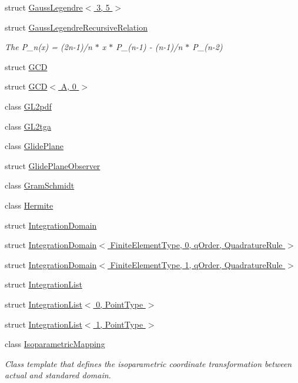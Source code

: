 \begin{DoxyCompactItemize}
struct \hyperlink{structmodel_1_1_gauss_legendre_3_013_00_015_01_4}{Gauss\+Legendre$<$ 3, 5 $>$}
\item 
struct \hyperlink{structmodel_1_1_gauss_legendre_recursive_relation}{Gauss\+Legendre\+Recursive\+Relation}
\begin{DoxyCompactList}\small\item\em The P\+\_\+n(x) = (2n-\/1)/n $\ast$ x $\ast$ P\+\_\+(n-\/1) -\/ (n-\/1)/n $\ast$ P\+\_\+(n-\/2) \end{DoxyCompactList}\item 
struct \hyperlink{structmodel_1_1_g_c_d}{G\+C\+D}
\item 
struct \hyperlink{structmodel_1_1_g_c_d_3_01_a_00_010_01_4}{G\+C\+D$<$ A, 0 $>$}
\item 
class \hyperlink{classmodel_1_1_g_l2pdf}{G\+L2pdf}
\item 
class \hyperlink{classmodel_1_1_g_l2tga}{G\+L2tga}
\item 
class \hyperlink{classmodel_1_1_glide_plane}{Glide\+Plane}
\item 
struct \hyperlink{structmodel_1_1_glide_plane_observer}{Glide\+Plane\+Observer}
\item 
class \hyperlink{classmodel_1_1_gram_schmidt}{Gram\+Schmidt}
\item 
class \hyperlink{classmodel_1_1_hermite}{Hermite}
\item 
struct \hyperlink{structmodel_1_1_integration_domain}{Integration\+Domain}
\item 
struct \hyperlink{structmodel_1_1_integration_domain_3_01_finite_element_type_00_010_00_01q_order_00_01_quadrature_rule_01_4}{Integration\+Domain$<$ Finite\+Element\+Type, 0, q\+Order, Quadrature\+Rule $>$}
\item 
struct \hyperlink{structmodel_1_1_integration_domain_3_01_finite_element_type_00_011_00_01q_order_00_01_quadrature_rule_01_4}{Integration\+Domain$<$ Finite\+Element\+Type, 1, q\+Order, Quadrature\+Rule $>$}
\item 
struct \hyperlink{structmodel_1_1_integration_list}{Integration\+List}
\item 
struct \hyperlink{structmodel_1_1_integration_list_3_010_00_01_point_type_01_4}{Integration\+List$<$ 0, Point\+Type $>$}
\item 
struct \hyperlink{structmodel_1_1_integration_list_3_011_00_01_point_type_01_4}{Integration\+List$<$ 1, Point\+Type $>$}
\item 
class \hyperlink{classmodel_1_1_isoparametric_mapping}{Isoparametric\+Mapping}
\begin{DoxyCompactList}\small\item\em Class template that defines the isoparametric coordinate transformation between actual and standared domain. \end{DoxyCompactList}\item 

\end{DoxyCompactItemize}
